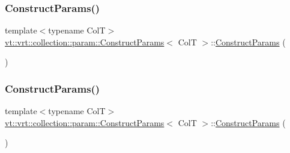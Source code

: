 \subsubsection{\texorpdfstring{Construct\+Params()}{ConstructParams()}\hspace{0.1cm}{\footnotesize\ttfamily [2/4]}}
{\footnotesize\ttfamily template$<$typename ColT$>$ \\
\hyperlink{structvt_1_1vrt_1_1collection_1_1param_1_1_construct_params}{vt\+::vrt\+::collection\+::param\+::\+Construct\+Params}$<$ ColT $>$\+::\hyperlink{structvt_1_1vrt_1_1collection_1_1param_1_1_construct_params}{Construct\+Params} (\begin{DoxyParamCaption}{ }\end{DoxyParamCaption})\hspace{0.3cm}{\ttfamily [default]}}

\mbox{\label{structvt_1_1vrt_1_1collection_1_1param_1_1_construct_params_ab64595f80b2c21decb1052b8182bc065}} 
\subsubsection{\texorpdfstring{Construct\+Params()}{ConstructParams()}\hspace{0.1cm}{\footnotesize\ttfamily [3/4]}}
{\footnotesize\ttfamily template$<$typename ColT$>$ \\
\hyperlink{structvt_1_1vrt_1_1collection_1_1param_1_1_construct_params}{vt\+::vrt\+::collection\+::param\+::\+Construct\+Params}$<$ ColT $>$\+::\hyperlink{structvt_1_1vrt_1_1collection_1_1param_1_1_construct_params}{Construct\+Params} (\begin{DoxyParamCaption}\item[{\hyperlink{structvt_1_1vrt_1_1collection_1_1param_1_1_construct_params}{Construct\+Params}$<$ ColT $>$ \&\&}]{ }\end{DoxyParamCaption})\hspace{0.3cm}{\ttfamily [default]}}

\mbox{\label{structvt_1_1vrt_1_1collection_1_1param_1_1_construct_params_a430216ddd65cdd399c97c0e32cbc5e35}} 
